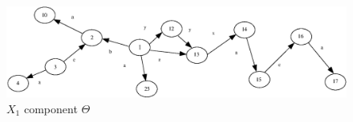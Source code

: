 \documentclass[a4paper,12pt]{article}
\numberwithin{equation}{section}
\numberwithin{figure}{section}
\begin{document}
\begin{figure}
\begin{center}
\includegraphics[scale=0.5, bb=0 0 300 600]{python/ex_K_X.eps}
\caption{$X_1$ component $\Theta$}
\label{fig:KX}
\end{center}
\end{figure}
\end{document}
